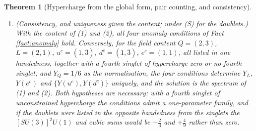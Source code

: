 \documentclass[11pt]{article}
\newtheorem{theorem}{Theorem}[section]
\theoremstyle{definition}
\begin{document}
\begin{theorem}[Hypercharge from the global form, pair counting, and consistency]
\begin{enumerate}
\item (Consistency, and uniqueness given the content; under (S) for the doublets.) With the content of (1) and (2), all four anomaly conditions of Fact \ref{fact:anomaly} hold. Conversely, for the field content $Q = (2,3)$, $L = (2,1)$, $u^{c} = (1,\bar{3})$, $d^{c} = (1,\bar{3})$, $e^{c} = (1,1)$, all listed in one handedness, together with a fourth singlet of hypercharge zero or no fourth singlet, and $Y_{Q} = 1/6$ as the normalisation, the four conditions determine $Y_{L}$, $Y(e^{c})$ and $\{Y(u^{c}), Y(d^{c})\}$ uniquely, and the solution is the spectrum of (1) and (2). Both hypotheses are necessary: with a fourth singlet of unconstrained hypercharge the conditions admit a one-parameter family, and if the doublets were listed in the opposite handedness from the singlets the $[SU(3)]^{2}U(1)$ and cubic sums would be $-\tfrac23$ and $+\tfrac49$ rather than zero.
\end{enumerate}
\end{theorem}
\end{document}
